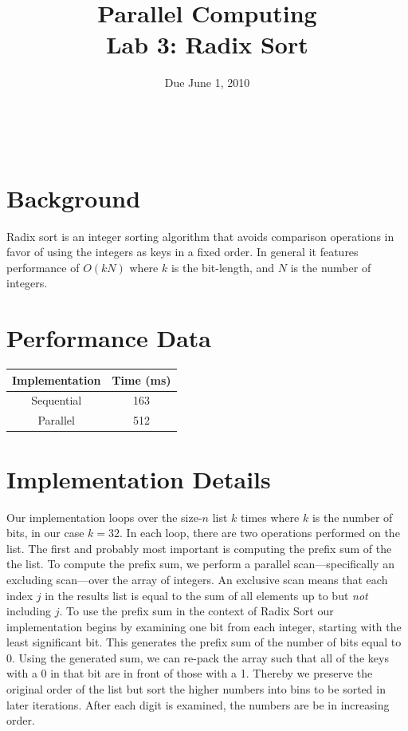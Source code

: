 \documentclass[12pt]{article}
\title{ Parallel Computing \\ Lab 3: Radix Sort }
\author{\MyFullName}
\date{ Due June 1, 2010 }
\renewcommand{\indent}{\hspace{0.25in}}
\begin{document}
\maketitle
\thispagestyle{empty}
\begin{center}
\end{center}
\setcounter{page}{0}
\newpage

\def\thesection{\Roman{section}.}
\hfill \\
\section{ Background }

\indent Radix sort is an integer sorting algorithm that avoids comparison operations in favor of using the integers as keys in a fixed order. 
In general it features performance of $O(k N)$ where $k$ is the bit-length, and $N$ is the number of integers.

\section{ Performance Data }
\begin{center}
\begin{tabular}{ c| c }

\textbf{Implementation} & \textbf{Time} (ms) \\ \hline
Sequential & 163 \\ 
Parallel & 512 \\ 
\end{tabular}
\end{center}

\section{ Implementation Details }
\indent  Our implementation loops over the size-$n$ list $k$ times where $k$ is the number of bits, in our case $k = 32$.   
In each loop, there are two operations performed on the list.  
The first and probably most important is computing the prefix sum of the the list.  
To compute the prefix sum, we perform a parallel scan---specifically an excluding scan---over the array of integers. 
An exclusive scan means that each index $j$ in the results list is equal to the sum of all elements up to but \emph{not} including $j$.  
To use the prefix sum in the context of Radix Sort our implementation begins by examining one bit from each integer, starting with the least significant bit. 
This generates the prefix sum of the number of bits equal to 0.  
Using the generated sum, we can re-pack the array such that all of the keys with a 0 in that bit are in front of those with a 1. Thereby we preserve the original order of the list but sort the higher numbers into bins to be sorted in later iterations. 
After each digit is examined, the numbers are be in increasing order. 
\end{document}
